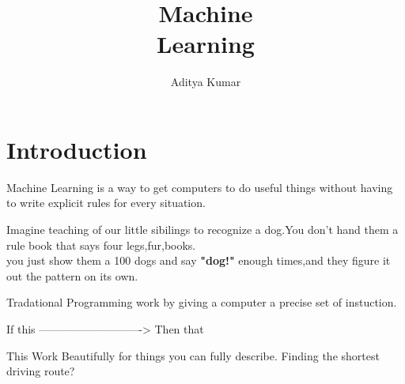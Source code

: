 \documentclass{report}
\title{\Huge{Machine}\\Learning}
\author{\huge{Aditya Kumar}}
\date{}
\begin{document}
\maketitle
\newpage%
\tableofcontents
\pagebreak

\chapter{Introduction}

\sol Machine Learning is a way to get computers to do useful things without having to write explicit rules for every situation.

\begin{eli5}
	Imagine teaching of our little sibilings to recognize a dog.You don't hand them a rule book that says four legs,fur,books.\\
	you just show them a 100 dogs and say \textbf{"dog!"} enough times,and they figure it out the pattern on its own.
\end{eli5}

Tradational Programming work by giving a computer a precise set of instuction.

\begin{center}
	If this ----------------------------> Then that
\end{center}

This Work Beautifully for things you can fully describe. Finding the shortest driving route?
\chapter{}
\end{document}
